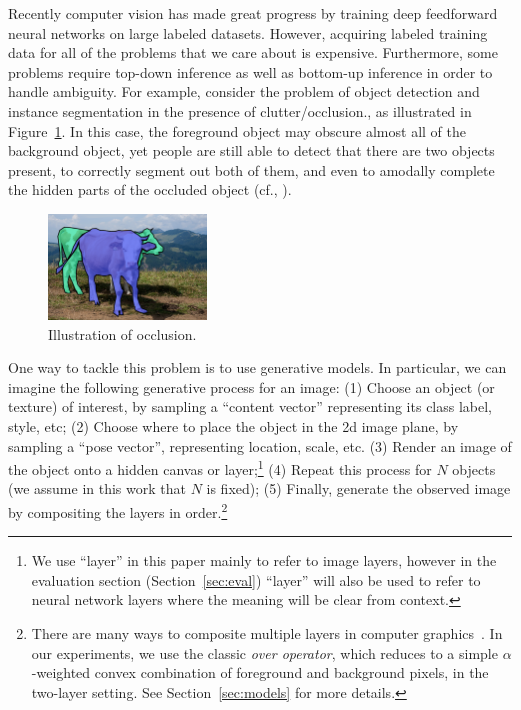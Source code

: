 

Recently computer vision has made great progress by training deep
feedforward neural networks on large labeled datasets.
However, acquiring labeled training data for all of the problems that
we care about is expensive.
Furthermore, some problems require top-down inference as well as
bottom-up inference in order to handle ambiguity.
For example, consider the problem of object detection
and instance segmentation  in the
presence of clutter/occlusion.,
 as illustrated in Figure~\ref{fig:cows}.
In this case, the foreground object may
obscure almost all of the background object, yet people are still able
to detect that there are two objects present, to correctly segment
out both of them, and even to amodally complete the hidden parts of
the occluded object (cf., \cite{Kar2015}).


\begin{figure}
\vspace{-4mm}
\begin{center}
    \includegraphics[width=0.375\textwidth]{figs/two_cows.png} \vspace{-2mm}
    \caption{\footnotesize Illustration of occlusion.}
    \label{fig:cows}
  \end{center}
  \vspace{-2mm}
\end{figure}



One way to tackle this problem is to use generative models.
In particular, we can imagine the following generative process for an image:
(1) Choose an object (or texture) of interest, by sampling a ``content vector''
representing its class label, style, etc;
(2) Choose where to
place the object in the 2d image plane, by sampling a ``pose vector'',
representing location, scale, etc. 
(3) Render an image of the object onto a hidden canvas or layer;\footnote{
We  use  ``layer''  in this paper mainly to refer to image layers, however
in the evaluation section (Section~\ref{sec:eval}) ``layer'' will also be used to refer to
neural network layers where the meaning will be clear from context.
}
(4) Repeat this process for $N$
objects (we assume in this work that $N$ is fixed);
(5) Finally, generate
the observed image by compositing the layers in order.\footnote{
%
There are many  ways to composite multiple layers in computer
graphics~\citep{porter1984compositing}. 
In our experiments, we use  the classic \emph{over operator}, which
reduces to a simple $\alpha$-weighted 
convex combination of foreground and background pixels,
in the two-layer setting.
 See Section~\ref{sec:models} for more details.
}

